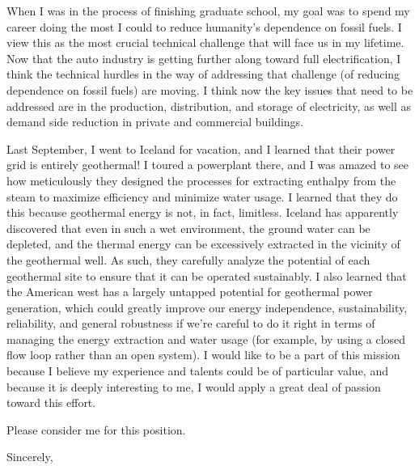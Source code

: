 \documentclass[11pt]{letter} %
\begin{document}
\begin{letter}{}
When I was in the process of finishing graduate school, my goal was to
spend my career doing the most I could to reduce humanity's dependence
on fossil fuels.  I view this as the most crucial technical challenge
that will face us in my lifetime.  Now that the auto industry is
getting further along toward full electrification, I think the
technical hurdles in the way of addressing that challenge (of reducing
dependence on fossil fuels) are moving.  I think now the key issues
that need to be addressed are in the production, distribution, and
storage of electricity, as well as demand side reduction in private
and commercial buildings.

Last September, I went to Iceland for vacation, and I learned that
their power grid is entirely geothermal!  I toured a powerplant there,
and I was amazed to see how meticulously they designed the processes
for extracting enthalpy from the steam to maximize efficiency and
minimize water usage.  I learned that they do this because geothermal
energy is not, in fact, limitless.  Iceland has apparently discovered
that even in such a wet environment, the ground water can be depleted,
and the thermal energy can be excessively extracted in the vicinity of
the geothermal well.  As such, they carefully analyze the potential of
each geothermal site to ensure that it can be operated sustainably.  I
also learned that the American west has a largely untapped potential
for geothermal power generation, which could greatly improve our
energy independence, sustainability, reliability, and general
robustness if we're careful to do it right in terms of managing the
energy extraction and water usage (for example, by using a closed flow
loop rather than an open system).  I would like to be a part of this
mission because I believe my experience and talents could be of
particular value, and because it is deeply interesting to me, I would
apply a great deal of passion toward this effort.

Please consider me for this position.  

\closing{Sincerely,}




\end{letter}
\end{document}
